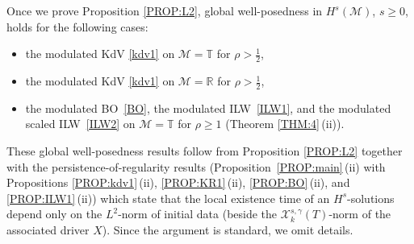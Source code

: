 \documentclass[letterpaper, 11pt,  reqno]{amsart}
\newcommand{\1}{\hspace{0.5mm}\text{I}\hspace{0.5mm}}
\newcommand{\noi}{\noindent}
\newcommand{\R}{\mathbb{R}}
\newcommand{\T}{\mathbb{T}}
\newcommand{\g}{\gamma}
\newcommand{\M}{\mathcal{M}}
\newcommand{\cX}{\mathcal{X}}
\numberwithin{equation}{section}
\numberwithin{theorem}{section}
\begin{document}
Once we prove 
 Proposition \ref{PROP:L2}, 
 global well-posedness in $H^s(\M)$, $s \ge 0$, 
holds
 for 
 the following cases:
 
  \smallskip
 \begin{itemize}
 \item[(i)]
 the modulated KdV \eqref{kdv1} on $\M = \T$
for   $\rho >  \frac 12$, 




 
 \smallskip
  \item[(ii)]
 the modulated KdV \eqref{kdv1} on $\M = \R$
for   $\rho >  \frac 12$, 



 \smallskip  
   \item[(iii)]
the modulated BO~\eqref{BO}, 
the modulated ILW~\eqref{ILW1}, 
and the modulated scaled ILW~\eqref{ILW2} on $\M = \T$
for  $\rho \ge 1 $
(Theorem \ref{THM:4}\,(ii)).


   
 
 \end{itemize}
 
  
  \noi
These global well-posedness results
follow from Proposition \ref{PROP:L2}
together with 
 the persistence-of-regularity results (Proposition~\ref{PROP:main}\,(ii)
with 
Propositions \ref{PROP:kdv1}\,(ii), 
 \ref{PROP:KR1}\,(ii), 
 \ref{PROP:BO}\,(ii), 
and  \ref{PROP:ILW1}\,(ii))
which state that the local existence
time of an $H^s$-solutions depend
only on the $L^2$-norm of initial data
(beside the $\cX^{s, \g}_k(T)$-norm of the associated driver $X$).
Since the argument is standard, we omit details.
\end{document}
